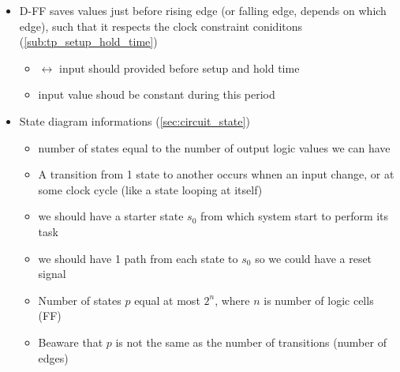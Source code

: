 \begin{itemize}
\item D-FF saves values just before rising edge (or falling edge, depends on which edge), such that it respects the clock constraint coniditons (\ref{sub:tp_setup_hold_time})

	\begin{itemize}
	\item $\leftrightarrow$ input should provided before setup and hold time
	
	\item input value shoud be constant during this period
	\end{itemize}


\item State diagram informations (\ref{sec:circuit_state})

	\begin{itemize}
	\item number of states equal to the number of output logic values we can have
	
	\item A transition from 1 state to another occurs whnen an input change, or at some clock cycle (like a state looping at itself)
	
	\item we should have a starter state $s_0$ from which system start to perform its task
	
	\item we should have 1 path from each state to $s_0$ so we could have a reset signal
	
	\item Number of states $p$ equal at most $2^n$, where $n$ is number of logic cells (FF)
	
	
	\item Beaware that $p$ is not the same as the number of transitions (number of edges)
	\end{itemize}

\end{itemize}















 